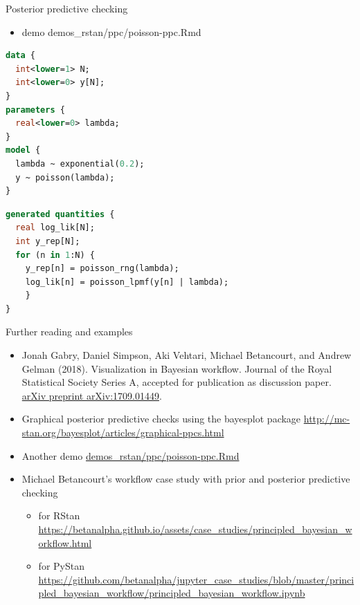 \documentclass[t]{beamer}
\begin{document}
\begin{frame}[fragile]

  {\Large\color{navyblue} Posterior predictive checking}

  \vspace{-0.2\parskip}
  \begin{itemize}
  \item demo demos\_rstan/ppc/poisson-ppc.Rmd
  \end{itemize}

  \vspace{-0.2\parskip}
  {\color{gray}\footnotesize
\begin{lstlisting}[language=Stan]
data {
  int<lower=1> N;
  int<lower=0> y[N];
}
parameters {
  real<lower=0> lambda;
}
model {
  lambda ~ exponential(0.2);
  y ~ poisson(lambda);
}
\end{lstlisting}
  }
  \vspace{-\parskip}
  {\footnotesize
\begin{lstlisting}[language=Stan]
generated quantities {
  real log_lik[N];
  int y_rep[N];
  for (n in 1:N) {
    y_rep[n] = poisson_rng(lambda);
    log_lik[n] = poisson_lpmf(y[n] | lambda);
    }
}
\end{lstlisting}
 }
\end{frame}


\begin{frame}

  {\Large\color{navyblue} Further reading and examples}

  \begin{itemize}
  \item Jonah Gabry, Daniel Simpson, Aki Vehtari, Michael
    Betancourt, and Andrew Gelman (2018). Visualization in Bayesian
    workflow. Journal of the Royal Statistical Society Series A,
    accepted for publication as discussion paper. \href{https://arxiv.org/abs/arXiv:1709.01449}{arXiv preprint arXiv:1709.01449}.
  \item Graphical posterior predictive checks using the bayesplot package
    \url{http://mc-stan.org/bayesplot/articles/graphical-ppcs.html}
  \item Another demo \href{http://avehtari.github.io/BDA_R_demos/demos_rstan/ppc/poisson-ppc.html}{demos\_rstan/ppc/poisson-ppc.Rmd}
  \item Michael Betancourt's workflow case study with prior and posterior predictive checking
    \begin{itemize}
    \item for RStan \url{https://betanalpha.github.io/assets/case_studies/principled_bayesian_workflow.html}
    \item for PyStan \url{https://github.com/betanalpha/jupyter_case_studies/blob/master/principled_bayesian_workflow/principled_bayesian_workflow.ipynb}
    \end{itemize}
  \end{itemize}
  
\end{frame}
\end{document}
